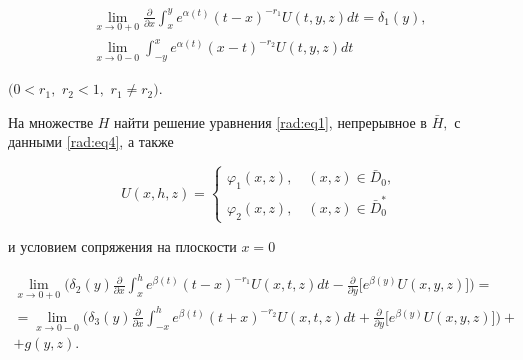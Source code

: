 \begin{task}[I]
\begin{equation}
\begin{array}{c}
\displaystyle

\lim_{x\to0+0} \frac{\partial}{\partial x}  \int _x^y e^{\alpha(t)}(t-x)^{-r_1} U(t,y,z) dt = \delta_1(y), \\[2mm]

\displaystyle

 \lim_{x\to0-0}  \int _{-y}^x e^{\alpha(t)}(x-t)^{-r_2} U(t,y,z) dt

 \end{array}

\end{equation}

$(0<r_1,$ $r_2<1,$ $r_1\not=r_2).$



\end{task}



\smallskip



\hypertarget{rad:task:II}{}

\begin{task}[II]

На множестве $H$ найти решение уравнения {\rm \eqref{rad:eq1},} непрерывное в $\bar{H},$ с данными {\rm \eqref{rad:eq4},}  а также

\begin{equation}

\label{rad:eq6}

U(x,h,z) = \left\{\begin{array}{l} \varphi_1(x,z), \quad (x,z)\in \bar{D}_0,\\

\varphi_2(x,z), \quad (x,z)\in \bar{D}_0^*

\end{array} \right.

\end{equation}

и условием сопряжения на плоскости $x=0$

\begin{multline}

\label{rad:eq7}

\lim_{x\to0+0} \biggl(\delta_2(y)\frac{\partial}{\partial x}  \int _x^h e^{\beta(t)}(t-x)^{-r_1} U(x,t,z) dt - \frac{\partial}{\partial y}\bigl[e^{\beta(y)}U(x,y,z)\bigr]\biggr) = 

\\

 = \lim_{x\to0-0} \biggl(\delta_3(y)\frac{\partial}{\partial x}  \int _{-x}^h e^{\beta(t)}(t+x)^{-r_2} U(x,t,z) dt +\frac{\partial}{\partial y}\bigl[e^{\beta(y)}U(x,y,z)\bigr]\biggr)+ \\ + g(y,z).

\end{multline}

\end{task}





